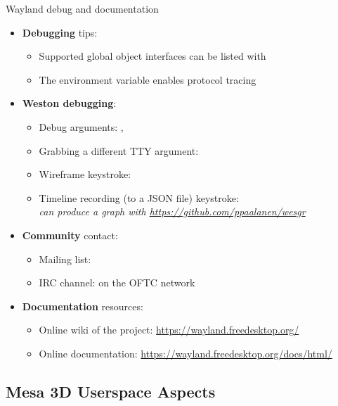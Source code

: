 \begin{frame}[fragile]{Wayland debug and documentation}
  \begin{itemize}
  \item \textbf{Debugging} tips:
    \begin{itemize}
    \item Supported global object interfaces can be listed with 
    \item The  environment variable enables protocol tracing
    \end{itemize}
  \item \textbf{Weston debugging}:
    \begin{itemize}
    \item Debug arguments: , 
    \item Grabbing a different TTY argument: 
    \item Wireframe keystroke: 
    \item Timeline recording (to a JSON file) keystroke: \\
      \textit{can produce a graph with \url{https://github.com/ppaalanen/wesgr}}
    \end{itemize}
  \item \textbf{Community} contact:
    \begin{itemize}
    \item Mailing list: 
    \item IRC channel:  on the OFTC network
    \end{itemize}
  \item \textbf{Documentation} resources:
    \begin{itemize}
    \item Online wiki of the project: \url{https://wayland.freedesktop.org/}
    \item Online documentation: \url{https://wayland.freedesktop.org/docs/html/}
    \end{itemize}
  \end{itemize}
\end{frame}

\subsection{Mesa 3D Userspace Aspects}

